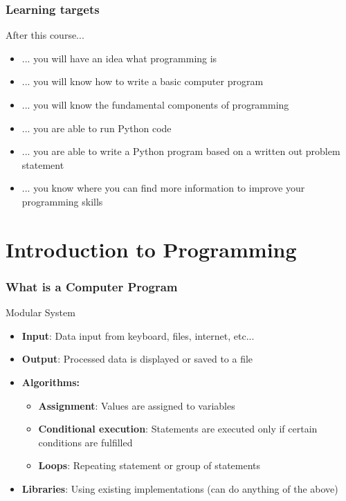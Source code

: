 \documentclass[10pt, a4paper]{beamer} %
\begin{document}
\begin{frame}[t]\frametitle{Learning targets}
    
After this course...
\begin{itemize}
    \item ... you will have an idea what programming is
    \item ... you will know how to write a basic computer program
    \item ... you will know the fundamental components of programming
    \item ... you are able to run Python code
    \item ... you are able to write a Python program based on a written out
    problem statement
    \item ... you know where you can find more information to improve your
    programming skills
\end{itemize}
\end{frame}


\section{Introduction to Programming} %
\label{sec:introduction_to_programming}

\begin{frame}[c]\frametitle{What is a Computer Program}
\begin{block}{Modular System}
    \begin{itemize}
        \item \textbf{Input}: Data input from keyboard, files, internet, etc...
        \item \textbf{Output}: Processed data is displayed or saved to a file
        \item \textbf{Algorithms:}
        \begin{itemize}
            \item \textbf{Assignment}: Values are assigned to variables
            \item \textbf{Conditional execution}: Statements are executed only if certain
            conditions are fulfilled
            \item \textbf{Loops}: Repeating statement or group of statements
        \end{itemize}
        
        \item \textbf{Libraries}: Using existing implementations (can do anything of the above)
    \end{itemize}

\end{block}     
\end{frame}
\end{document}
